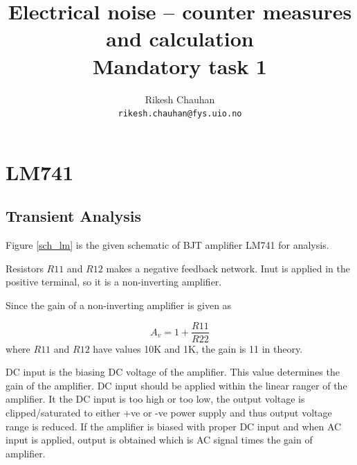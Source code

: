 \documentclass[12pt,a4paper,UKenglish]{article}
\title{Electrical noise – counter measures and calculation\\
Mandatory task 1}
\author{Rikesh Chauhan\\ 
\texttt{rikesh.chauhan@fys.uio.no}}
\date{}
\begin{document}
\maketitle

\section{LM741}
\subsection{Transient Analysis}
Figure \ref{sch_lm} is the given schematic of BJT amplifier LM741 for analysis.

Resistors $R11$ and $R12$ makes a negative feedback network. Inut is applied in the positive terminal, so it is a non-inverting amplifier. 

Since the gain of a non-inverting amplifier is given as 

\begin{equation*}
A_v = 1 + \frac{R11}{R22}
\end{equation*}
 where $R11$ and $R12$ have values 10K and 1K, the gain is 11 in theory.

DC input is the biasing DC voltage of the amplifier. This value determines the gain of the amplifier. DC input should be applied within the linear ranger of the amplifier. It the DC input is too high or too low, the output voltage is clipped/saturated to either +ve or -ve power supply and thus output voltage range is reduced. If the amplifier is biased with proper DC input and  when AC input is applied, output is obtained which is AC signal times the gain of amplifier. \\ 
\end{document}
